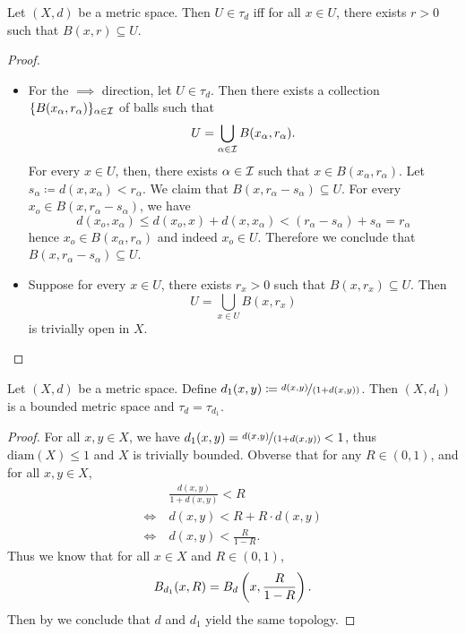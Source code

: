 \documentclass{techreport}
\begin{document}
\begin{proposition}\label{Prop:MetricOpenFindABall}
	Let $(X,d)$ be a metric space. Then $U \in \tau_d$ iff for all $x \in U$, there exists $r >0$ such that $B(x,r) \subseteq U$.
\end{proposition}
\begin{proof}
	\begin{itemize}
		\item For the ${\implies}$ direction, let $U \in \tau_d$.
		Then there exists a collection $\{B(x_\alpha,r_\alpha)\}_{\alpha \in \mathcal{I}}$ of balls such that
		\[
		U = \bigcup_{\alpha \in \mathcal{I}} B(x_\alpha,r_\alpha).
		\]
		For every $x \in U$, then, there exists $\alpha \in \mathcal{I}$ such that $x \in B(x_\alpha,r_\alpha)$.
		Let $s_\alpha \coloneqq d(x,x_\alpha) < r_\alpha$.
		We claim that $B(x,r_\alpha-s_\alpha) \subseteq U$.
		For every $x_o \in B(x,r_\alpha-s_\alpha)$, we have
		\[
		d(x_o,x_\alpha) \le d(x_o,x) + d(x,x_\alpha) < (r_\alpha - s_\alpha) + s_\alpha = r_\alpha
		\]
		hence $x_o \in B(x_\alpha,r_\alpha)$ and indeed $x_o \in U$.
		Therefore we conclude that $B(x,r_\alpha-s_\alpha) \subseteq U$.
		
		\item Suppose for every $x \in U$, there exists $r_x > 0$ such that $B(x,r_x) \subseteq U$.
		Then
		\[
		U = \bigcup_{x \in U} B(x,r_x)
		\]
		is trivially open in $X$.
	\end{itemize}
\end{proof}

\begin{proposition}\label{Prop:MetricCanAlwaysBounded}
	Let $(X,d)$ be a metric space.
	Define $d_1(x,y) \coloneqq \nicefrac{d(x,y)}{(1 + d(x,y))}$.
	Then $(X,d_1)$ is a bounded metric space and $\tau_d = \tau_{d_1}$.
\end{proposition}
\begin{proof}
	For all $x,y \in X$, we have $d_1(x,y) = \nicefrac{d(x,y)}{(1+d(x,y))} < 1$, thus $\mathrm{diam}(X) \le 1$ and $X$ is trivially bounded.
	Obverse that for any $R \in (0,1)$, and for all $x, y \in X$,
	\begin{align*}
		& \frac{d(x,y)}{1+d(x,y)} < R \\
		\iff~ & d(x,y) < R + R \cdot d(x,y) \\
		\iff~ & d(x,y) < \frac{R}{1-R}.
	\end{align*}
	Thus we know that for all $x \in X$ and $R \in (0,1)$,
	\[
	B_{d_1}(x,R) = B_d\left({x, \frac{R}{1-R} }\right).
	\]
	Then by  we conclude that $d$ and $d_1$ yield the same topology.
\end{proof}
\end{document}
